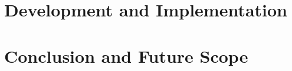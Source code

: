 \documentclass[12pt]{report}
\begin{document}
\chapter{Development and Implementation}




\chapter{Conclusion and Future Scope}



%

\end{document}
